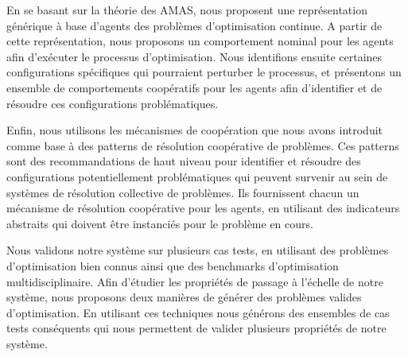 En se basant sur la théorie des AMAS, nous proposent une représentation générique à base d'agents des problèmes d'optimisation continue. A partir de cette représentation, nous proposons un comportement nominal pour les agents afin d'exécuter le processus d'optimisation. Nous identifions ensuite certaines configurations spécifiques qui pourraient perturber le processus, et présentons un ensemble de comportements coopératifs pour les agents afin d'identifier et de résoudre ces configurations problématiques.

Enfin, nous utilisons les mécanismes de coopération que nous avons introduit comme base à des patterns de résolution coopérative de problèmes. Ces patterns sont des recommandations de haut niveau pour identifier et résoudre des configurations potentiellement problématiques qui peuvent survenir au sein de systèmes de résolution collective de problèmes. Ils fournissent chacun un mécanisme de résolution coopérative pour les agents, en utilisant des indicateurs abstraits qui doivent être instanciés pour le problème en cours.

Nous validons notre système sur plusieurs cas tests, en utilisant des problèmes d'optimisation bien connus ainsi que des benchmarks d'optimisation multidisciplinaire. Afin d'étudier les propriétés de passage à l'échelle de notre système, nous proposons deux manières de générer des problèmes valides d'optimisation. En utilisant ces techniques nous générons des ensembles de cas tests conséquents qui nous permettent de valider plusieurs propriétés de notre système.

\vspace{-0.4cm}
\begin{center}{\hrulefill}\end{center}
\cleardoublepage